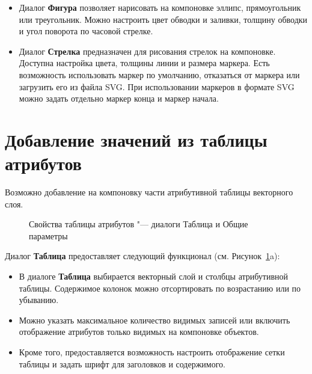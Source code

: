\begin{itemize}[label=--]
\item Диалог \textbf{Фигура} позволяет нарисовать на компоновке эллипс,
прямоугольник или треугольник. Можно настроить цвет обводки и заливки,
толщину обводки и угол поворота по часовой стрелке.
\item Диалог \textbf{Стрелка} предназначен для рисования стрелок на
компоновке. Доступна настройка цвета, толщины линии и размера маркера.
Есть возможность использовать маркер по умолчанию, отказаться от маркера
или загрузить его из файла SVG. При использовании маркеров в формате SVG
можно задать отдельно маркер конца и маркер начала.
\end{itemize}

\section{Добавление значений из таблицы атрибутов}

Возможно добавление на компоновку части атрибутивной таблицы векторного
слоя.

\begin{figure}[ht]
\centering
{}
\hspace{1cm}
\caption{Свойства таблицы атрибутов "--- диалоги Таблица и Общие параметры \wincaption}\label{fig:attrcomp}
\end{figure}


Диалог \textbf{Таблица} предоставляет следующий функционал
(см. Рисунок~\ref{fig:attrcomp}a):

\begin{itemize}[label=--]
\item В диалоге \textbf{Таблица} выбирается векторный слой и столбцы
атрибутивной таблицы. Содержимое колонок можно отсортировать по возрастанию
или по убыванию.
\item Можно указать максимальное количество видимых записей или включить
отображение атрибутов только видимых на компоновке объектов.
\item Кроме того, предоставляется возможность настроить отображение сетки
таблицы и задать шрифт для заголовков и содержимого.
\end{itemize}

